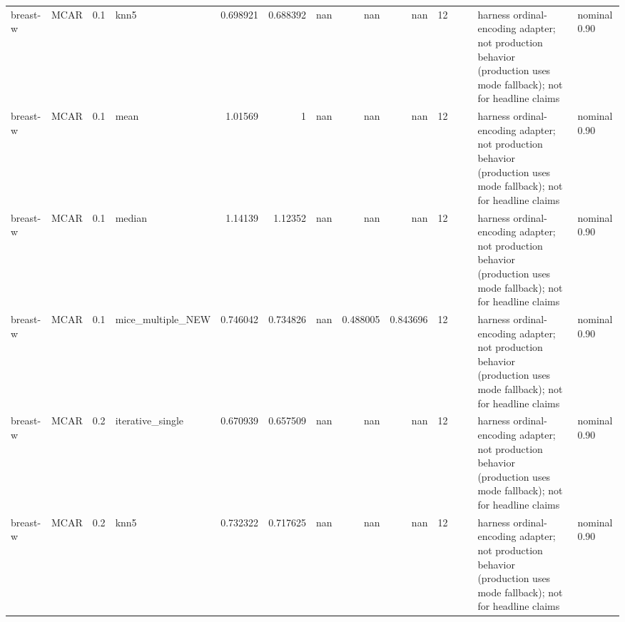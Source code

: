 \begin{table}[ht]
\begin{tabular}{llrlrrrrrrllll}
 breast-w             & MCAR        &         0.1 & knn5              &       0.698921 &             0.688392 &               nan        &                     nan        &                       nan        &        12 &                    &                                         & harness ordinal-encoding adapter; not production behavior (production uses mode fallback); not for headline claims & nominal 0.90              \\
 breast-w             & MCAR        &         0.1 & mean              &       1.01569  &             1        &               nan        &                     nan        &                       nan        &        12 &                    &                                         & harness ordinal-encoding adapter; not production behavior (production uses mode fallback); not for headline claims & nominal 0.90              \\
 breast-w             & MCAR        &         0.1 & median            &       1.14139  &             1.12352  &               nan        &                     nan        &                       nan        &        12 &                    &                                         & harness ordinal-encoding adapter; not production behavior (production uses mode fallback); not for headline claims & nominal 0.90              \\
 breast-w             & MCAR        &         0.1 & mice\_multiple\_NEW &       0.746042 &             0.734826 &               nan        &                       0.488005 &                         0.843696 &        12 &                    &                                         & harness ordinal-encoding adapter; not production behavior (production uses mode fallback); not for headline claims & nominal 0.90              \\
 breast-w             & MCAR        &         0.2 & iterative\_single  &       0.670939 &             0.657509 &               nan        &                     nan        &                       nan        &        12 &                    &                                         & harness ordinal-encoding adapter; not production behavior (production uses mode fallback); not for headline claims & nominal 0.90              \\
 breast-w             & MCAR        &         0.2 & knn5              &       0.732322 &             0.717625 &               nan        &                     nan        &                       nan        &        12 &                    &                                         & harness ordinal-encoding adapter; not production behavior (production uses mode fallback); not for headline claims & nominal 0.90              \\

\end{tabular}
\end{table}
